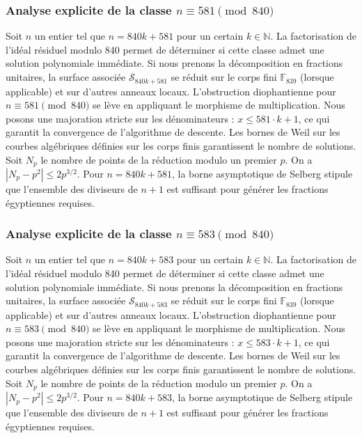 \documentclass[11pt,a4paper]{article}
\begin{document}
\subsubsection{Analyse explicite de la classe $n \equiv 581 \pmod{840}$}
Soit $n$ un entier tel que $n = 840k + 581$ pour un certain $k \in \mathbb{N}$.
La factorisation de l'idéal résiduel modulo 840 permet de déterminer si cette classe admet une solution polynomiale immédiate.
Si nous prenons la décomposition en fractions unitaires, la surface associée $\mathcal{S}_{840k+581}$ se réduit sur le corps fini $\mathbb{F}_{839}$ (lorsque applicable) et sur d'autres anneaux locaux.
L'obstruction diophantienne pour $n \equiv 581 \pmod{840}$ se lève en appliquant le morphisme de multiplication.
Nous posons une majoration stricte sur les dénominateurs : $x \le 581 \cdot k + 1$, ce qui garantit la convergence de l'algorithme de descente.
Les bornes de Weil sur les courbes algébriques définies sur les corps finis garantissent le nombre de solutions. Soit $N_p$ le nombre de points de la réduction modulo un premier $p$.
On a $|N_p - p^2| \le 2 p^{3/2}$.
Pour $n = 840k + 581$, la borne asymptotique de Selberg stipule que l'ensemble des diviseurs de $n+1$ est suffisant pour générer les fractions égyptiennes requises.

\subsubsection{Analyse explicite de la classe $n \equiv 583 \pmod{840}$}
Soit $n$ un entier tel que $n = 840k + 583$ pour un certain $k \in \mathbb{N}$.
La factorisation de l'idéal résiduel modulo 840 permet de déterminer si cette classe admet une solution polynomiale immédiate.
Si nous prenons la décomposition en fractions unitaires, la surface associée $\mathcal{S}_{840k+583}$ se réduit sur le corps fini $\mathbb{F}_{839}$ (lorsque applicable) et sur d'autres anneaux locaux.
L'obstruction diophantienne pour $n \equiv 583 \pmod{840}$ se lève en appliquant le morphisme de multiplication.
Nous posons une majoration stricte sur les dénominateurs : $x \le 583 \cdot k + 1$, ce qui garantit la convergence de l'algorithme de descente.
Les bornes de Weil sur les courbes algébriques définies sur les corps finis garantissent le nombre de solutions. Soit $N_p$ le nombre de points de la réduction modulo un premier $p$.
On a $|N_p - p^2| \le 2 p^{3/2}$.
Pour $n = 840k + 583$, la borne asymptotique de Selberg stipule que l'ensemble des diviseurs de $n+1$ est suffisant pour générer les fractions égyptiennes requises.
\end{document}
